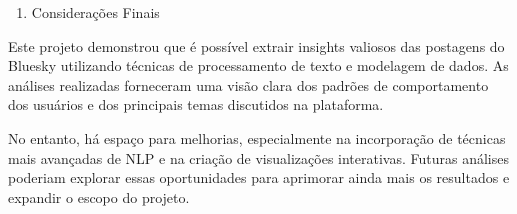 \documentclass[
  letterpaper,
  DIV=11,
  numbers=noendperiod]{scrartcl}
\providecommand{\tightlist}{%
  \setlength{\itemsep}{0pt}\setlength{\parskip}{0pt}}\usepackage{longtable,booktabs,array}
\begin{document}
\begin{enumerate}
\def\labelenumi{\arabic{enumi}.}
\setcounter{enumi}{4}
\tightlist
\item
  Considerações Finais
\end{enumerate}

Este projeto demonstrou que é possível extrair insights valiosos das
postagens do Bluesky utilizando técnicas de processamento de texto e
modelagem de dados. As análises realizadas forneceram uma visão clara
dos padrões de comportamento dos usuários e dos principais temas
discutidos na plataforma.

No entanto, há espaço para melhorias, especialmente na incorporação de
técnicas mais avançadas de NLP e na criação de visualizações
interativas. Futuras análises poderiam explorar essas oportunidades para
aprimorar ainda mais os resultados e expandir o escopo do projeto.

\printindex
\end{document}
